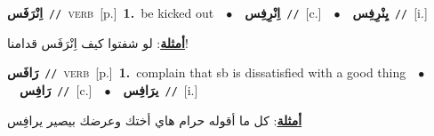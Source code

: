 \documentclass[10pt,a4paper,twoside]{article} %
\begin{document}
\begin{multicols}{2}
{\setlength\topsep{0pt}\textbf{\foreignlanguage{arabic}{اِنْرَفَس}}\ {\color{gray}\texttt{//}\color{black}}\ \textsc{verb}\ [p.]\ \textbf{1.}~be kicked out\ \ $\bullet$\ \ \setlength\topsep{0pt}\textbf{\foreignlanguage{arabic}{اِنْرِفِس}}\ {\color{gray}\texttt{//}\color{black}}\ [c.]\ \ $\bullet$\ \ \setlength\topsep{0pt}\textbf{\foreignlanguage{arabic}{يِنْرِفِس}}\ {\color{gray}\texttt{//}\color{black}}\ [i.]\  \begin{flushright}\color{gray}\foreignlanguage{arabic}{\textbf{\underline{\foreignlanguage{arabic}{أمثلة}}}: لو شفتوا كيف اِنْرَفَس قدامنا!}\end{flushright}\color{black}} \vspace{2mm}

{\setlength\topsep{0pt}\textbf{\foreignlanguage{arabic}{رَافَس}}\ {\color{gray}\texttt{//}\color{black}}\ \textsc{verb}\ [p.]\ \textbf{1.}~complain that sb is dissatisfied with a good thing\ \ $\bullet$\ \ \setlength\topsep{0pt}\textbf{\foreignlanguage{arabic}{رَافِس}}\ {\color{gray}\texttt{//}\color{black}}\ [c.]\ \ $\bullet$\ \ \setlength\topsep{0pt}\textbf{\foreignlanguage{arabic}{يرَافِس}}\ {\color{gray}\texttt{//}\color{black}}\ [i.]\  \begin{flushright}\color{gray}\foreignlanguage{arabic}{\textbf{\underline{\foreignlanguage{arabic}{أمثلة}}}: كل ما أقوله حرام هاي أختك وعرضك بيصير يرافِس}\end{flushright}\color{black}} \vspace{2mm}


\end{multicols}
\end{document}
